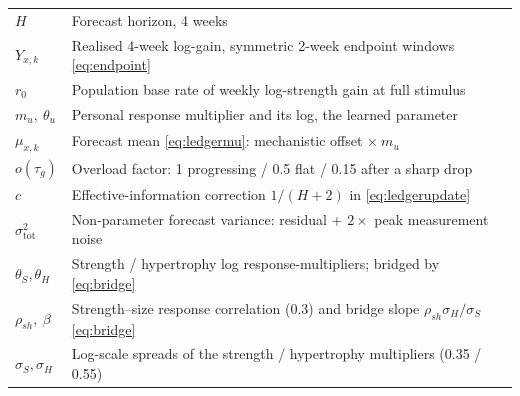 \documentclass[11pt,a4paper]{article}
\begin{document}
\begin{center}
\begin{tabular}{@{}lp{10.5cm}@{}}
$H$ & Forecast horizon, 4 weeks\\
$Y_{x,k}$ & Realised 4-week log-gain, symmetric 2-week endpoint windows \eqref{eq:endpoint}\\
$r_0$ & Population base rate of weekly log-strength gain at full stimulus\\
$m_u,\ \theta_u$ & Personal response multiplier and its log, the learned parameter\\
$\mu_{x,k}$ & Forecast mean \eqref{eq:ledgermu}: mechanistic offset $\times\ m_u$\\
$o(\tau_g)$ & Overload factor: 1 progressing / 0.5 flat / 0.15 after a sharp drop\\
$c$ & Effective-information correction $1/(H{+}2)$ in \eqref{eq:ledgerupdate}\\
$\sigma^{2}_{\text{tot}}$ & Non-parameter forecast variance: residual + $2\times$ peak measurement noise\\
$\theta_S,\theta_H$ & Strength / hypertrophy log response-multipliers; bridged by \eqref{eq:bridge}\\
$\rho_{sh},\ \beta$ & Strength--size response correlation ($0.3$) and bridge slope $\rho_{sh}\sigma_H/\sigma_S$ \eqref{eq:bridge}\\
$\sigma_S,\sigma_H$ & Log-scale spreads of the strength / hypertrophy multipliers (0.35 / 0.55)\\
\bottomrule
\end{tabular}
\end{center}
\end{document}
